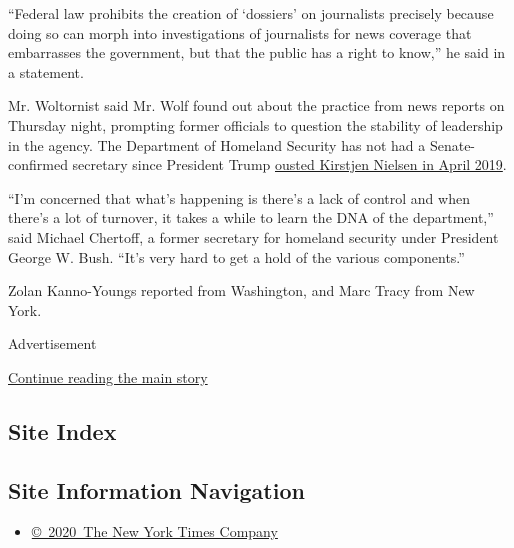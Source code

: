 ``Federal law prohibits the creation of `dossiers' on journalists
precisely because doing so can morph into investigations of journalists
for news coverage that embarrasses the government, but that the public
has a right to know,'' he said in a statement.

Mr. Woltornist said Mr. Wolf found out about the practice from news
reports on Thursday night, prompting former officials to question the
stability of leadership in the agency. The Department of Homeland
Security has not had a Senate-confirmed secretary since President Trump
\href{https://www.nytimes3xbfgragh.onion/2019/04/07/us/politics/kirstjen-nielsen-dhs-resigns.html}{ousted
Kirstjen Nielsen in April 2019}.

``I'm concerned that what's happening is there's a lack of control and
when there's a lot of turnover, it takes a while to learn the DNA of the
department,'' said Michael Chertoff, a former secretary for homeland
security under President George W. Bush. ``It's very hard to get a hold
of the various components.''

Zolan Kanno-Youngs reported from Washington, and Marc Tracy from New
York.

Advertisement

\protect\hyperlink{after-bottom}{Continue reading the main story}

\hypertarget{site-index}{%
\subsection{Site Index}\label{site-index}}

\hypertarget{site-information-navigation}{%
\subsection{Site Information
Navigation}\label{site-information-navigation}}

\begin{itemize}
\tightlist
\item
  \href{https://help.nytimes3xbfgragh.onion/hc/en-us/articles/115014792127-Copyright-notice}{©~2020~The
  New York Times Company}
\end{itemize}

